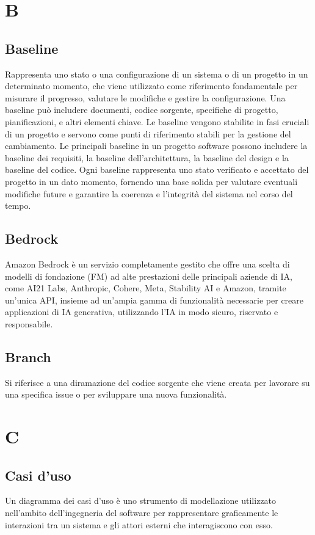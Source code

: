 \documentclass{article}
\begin{document}
\section{B}
\subsection{Baseline}
Rappresenta uno stato o una configurazione di un sistema o di un progetto in un determinato momento, che viene utilizzato come riferimento fondamentale per misurare il progresso, valutare le modifiche e gestire la configurazione. Una baseline può includere documenti, codice sorgente, specifiche di progetto, pianificazioni, e altri elementi chiave.
Le baseline vengono stabilite in fasi cruciali di un progetto e servono come punti di riferimento stabili per la gestione del cambiamento. Le principali baseline in un progetto software possono includere la baseline dei requisiti, la baseline dell'architettura, la baseline del design e la baseline del codice. Ogni baseline rappresenta uno stato verificato e accettato del progetto in un dato momento, fornendo una base solida per valutare eventuali modifiche future e garantire la coerenza e l'integrità del sistema nel corso del tempo.

\subsection{Bedrock}
Amazon Bedrock è un servizio completamente gestito che offre una scelta di modelli di fondazione (FM) ad alte prestazioni delle principali aziende di IA, come AI21 Labs, Anthropic, Cohere, Meta, Stability AI e Amazon, tramite un'unica API, insieme ad un'ampia gamma di funzionalità necessarie per creare applicazioni di IA generativa, utilizzando l'IA in modo sicuro, riservato e responsabile.

\subsection{Branch}
Si riferisce a una diramazione del codice sorgente che viene creata per lavorare su una specifica issue o per sviluppare una nuova funzionalità.

\section{C}

\subsection{Casi d'uso}
Un diagramma dei casi d'uso è uno strumento di modellazione utilizzato nell'ambito dell'ingegneria del software per rappresentare graficamente le interazioni tra un sistema e gli attori esterni che interagiscono con esso.
\end{document}
